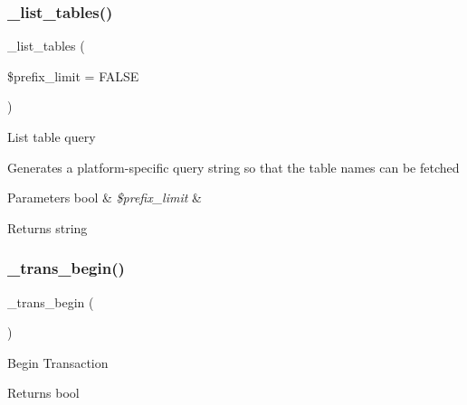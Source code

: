 \subsubsection{\texorpdfstring{\+\_\+list\+\_\+tables()}{\_list\_tables()}}
{\footnotesize\ttfamily \+\_\+list\+\_\+tables (\begin{DoxyParamCaption}\item[{}]{\$prefix\+\_\+limit = {\ttfamily FALSE} }\end{DoxyParamCaption})\hspace{0.3cm}{\ttfamily [protected]}}

List table query

Generates a platform-\/specific query string so that the table names can be fetched


\begin{DoxyParams}[1]{Parameters}
bool & {\em \$prefix\+\_\+limit} & \\
\hline
\end{DoxyParams}
\begin{DoxyReturn}{Returns}
string 
\end{DoxyReturn}
\mbox{\label{class_c_i___d_b__mssql__driver_ac81ac882c1d54347d810199a15856aac}} 
\subsubsection{\texorpdfstring{\+\_\+trans\+\_\+begin()}{\_trans\_begin()}}
{\footnotesize\ttfamily \+\_\+trans\+\_\+begin (\begin{DoxyParamCaption}{ }\end{DoxyParamCaption})\hspace{0.3cm}{\ttfamily [protected]}}

Begin Transaction

\begin{DoxyReturn}{Returns}
bool 
\end{DoxyReturn}
\mbox{\label{class_c_i___d_b__mssql__driver_a6fe7f373e0b11cfae23a5f41c0b35dda}} 
